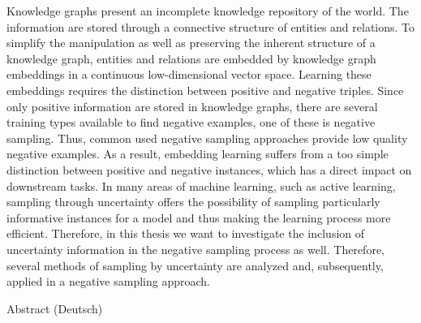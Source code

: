 %
\label{sec:abstract}

Knowledge graphs present an incomplete knowledge repository of the world.
The information are stored through a connective structure of entities and relations.
To simplify the manipulation as well as preserving the inherent structure of a knowledge graph, entities and relations are embedded by knowledge graph embeddings in a continuous low-dimensional vector space.
Learning these embeddings requires the distinction between positive and negative triples.
Since only positive information are stored in knowledge graphs, 
there are several training types available to find negative examples, one of these is negative sampling. 
Thus, common used negative sampling approaches provide low quality negative examples.
As a result, embedding learning suffers from a too simple distinction between positive and negative instances, which has a direct impact on downstream tasks.
In many areas of machine learning, such as active learning, sampling through uncertainty offers the possibility of sampling particularly informative instances for a model and thus making the learning process more efficient.
Therefore, in this thesis we want to investigate the inclusion of uncertainty information in the negative sampling process as well.
Therefore, several methods of sampling by uncertainty are analyzed and, subsequently, applied in a negative sampling approach.

\vspace*{20mm}

{Abstract (Deutsch)}
\label{sec:abstract-german}


